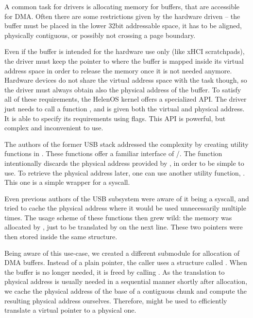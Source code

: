 A common task for drivers is allocating memory for buffers, that are accessible
for DMA. Often there are some restrictions given by the hardware driven -- the
buffer must be placed in the lower 32bit addressable space, it has to be
aligned, physically contiguous, or possibly not crossing a page boundary.

Even if the buffer is intended for the hardware use only (like xHCI
scratchpads), the driver must keep the pointer to where the buffer is mapped
inside its virtual address space in order to release the memory once it is not
needed anymore. Hardware devices do not share the virtual address space with
the task though, so the driver must always obtain also the physical address of
the buffer. To satisfy all of these requirements, the HelenOS kernel offers
a specialized API. The driver just needs to call a function
, and is given both the virtual and physical address. It
is able to specify its requirements using flags. This API is powerful, but
complex and inconvenient to use.

The authors of the former USB stack addressed the complexity by creating
utility functions in
.
These functions offer
a familiar interface of /. The  function
intentionally discards the physical address provided by
, in order to be simple to use. To retrieve the physical
address later, one can use another utility function, . This
one is a simple wrapper for a syscall.

Even previous authors of the USB subsystem were aware of it being a syscall,
and tried to cache the physical address where it would be used unnecessarily
multiple times. The usage scheme of these functions then grew wild: the memory
was allocated by , just to be translated by  on
the next line. These two pointers were then stored inside the same structure.

Being aware of this use-case, we created a different submodule for allocation
of DMA buffers. Instead of a plain pointer, the caller uses a structure called
. When the buffer is no longer needed, it is freed by
calling . As the translation to physical address is
usually needed in a sequential manner shortly after allocation, we cache the
physical address of the base of a contiguous chunk and compute the resulting
physical address ourselves. Therefore,  might be used to
efficiently translate a virtual pointer to a physical one.

